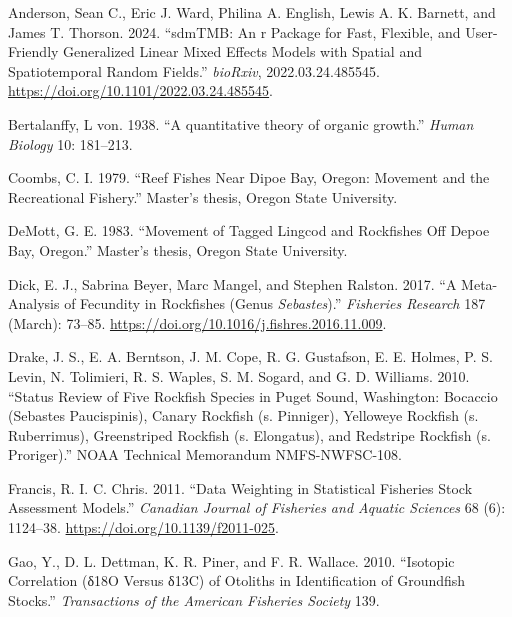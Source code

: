 \documentclass[
  english,
]{article}
\newlength{\cslhangindent}
\newenvironment{CSLReferences}[2] %
 {\begin{list}{}{%
  \setlength{\itemindent}{0pt}
  \setlength{\leftmargin}{0pt}
  \setlength{\parsep}{0pt}
  \ifodd #1
   \setlength{\leftmargin}{\cslhangindent}
   \setlength{\itemindent}{-1\cslhangindent}
  \fi
  \setlength{\itemsep}{#2\baselineskip}}}
 {\end{list}}
\begin{document}
\label{refs}
\begin{CSLReferences}{1}{0}
Anderson, Sean C., Eric J. Ward, Philina A. English, Lewis A. K.
Barnett, and James T. Thorson. 2024. {``sdmTMB: An r Package for Fast,
Flexible, and User-Friendly Generalized Linear Mixed Effects Models with
Spatial and Spatiotemporal Random Fields.''} \emph{bioRxiv},
2022.03.24.485545. \url{https://doi.org/10.1101/2022.03.24.485545}.

Bertalanffy, L von. 1938. {``{A quantitative theory of organic
growth}.''} \emph{Human Biology} 10: 181--213.

Coombs, C. I. 1979. {``Reef Fishes Near Dipoe Bay, Oregon: Movement and
the Recreational Fishery.''} Master's thesis, Oregon State University.

DeMott, G. E. 1983. {``Movement of Tagged Lingcod and Rockfishes Off
Depoe Bay, Oregon.''} Master's thesis, Oregon State University.

Dick, E. J., Sabrina Beyer, Marc Mangel, and Stephen Ralston. 2017. {``A
Meta-Analysis of Fecundity in Rockfishes (Genus \emph{Sebastes}).''}
\emph{Fisheries Research} 187 (March): 73--85.
\url{https://doi.org/10.1016/j.fishres.2016.11.009}.

Drake, J. S., E. A. Berntson, J. M. Cope, R. G. Gustafson, E. E. Holmes,
P. S. Levin, N. Tolimieri, R. S. Waples, S. M. Sogard, and G. D.
Williams. 2010. {``Status Review of Five Rockfish Species in Puget
Sound, Washington: Bocaccio (Sebastes Paucispinis), Canary Rockfish (s.
Pinniger), Yelloweye Rockfish (s. Ruberrimus), Greenstriped Rockfish (s.
Elongatus), and Redstripe Rockfish (s. Proriger).''} NOAA Technical
Memorandum NMFS-NWFSC-108.

Francis, R. I. C. Chris. 2011. {``Data Weighting in Statistical
Fisheries Stock Assessment Models.''} \emph{Canadian Journal of
Fisheries and Aquatic Sciences} 68 (6): 1124--38.
\url{https://doi.org/10.1139/f2011-025}.

Gao, Y., D. L. Dettman, K. R. Piner, and F. R. Wallace. 2010.
{``Isotopic Correlation (δ18O Versus δ13C) of Otoliths in Identification
of Groundfish Stocks.''} \emph{Transactions of the American Fisheries
Society} 139.


\end{CSLReferences}
\end{document}
